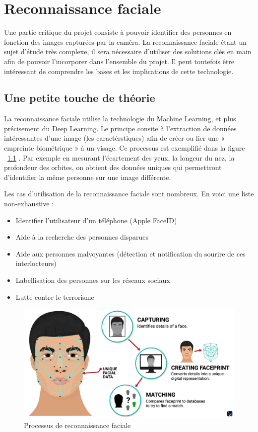 \chapter{Reconnaissance faciale}
\label{ch:reco_faciale}

Une partie critique du projet consiste à pouvoir identifier des personnes en fonction des images capturées par la
caméra. La reconnaissance faciale étant un sujet d’étude très complexe, il sera nécessaire d’utiliser des solutions
clés en main afin de pouvoir l’incorporer dans l’ensemble du projet. Il peut toutefois être intéressant de
comprendre les bases et les implications de cette technologie.

\section{Une petite touche de théorie}
La reconnaissance faciale utilise la technologie du Machine Learning, et plus précisement du Deep Learning.
Le principe consite à l’extraction de données intéressantes d’une image (les caractérstiques) afin de créer ou lier une
« empreinte biométrique » à un visage. Ce processus est exemplifié dans la figure ~\ref{fig:reco-process} . Par exemple en mesurant l’écartement des yeux, la longeur du nez, la
profondeur des orbites, on obtient des données uniques qui permettront d’identifier la même personne sur une
image différente.

Les cas d’utilisation de la reconnaissance faciale sont nombreux.
En voici une liste non-exhaustive :
\begin{itemize}
\item Identifier l’utilisateur d’un téléphone (Apple FaceID)
\item Aide à la recherche des personnes disparues
\item Aide aux personnes malvoyantes (détection et notification du sourire de ces interlocteurs)
\item Labellisation des personnes sur les réseaux sociaux
\item Lutte contre le terrorisme
\end{itemize}

\begin{figure}[H]
	\centering
	\includegraphics[width=12cm]{images/proto-5.png}
	\caption{Processus de reconnaissance faciale}
	\label{fig:reco-process}
\end{figure}

